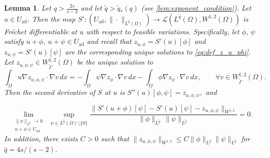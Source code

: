 \documentclass[11pt]{article}
\newcommand{\feas}{U_{\textrm{ad}}}
\newtheorem{lemma}[theorem]{Lemma}
\theoremstyle{definition}
\theoremstyle{remark}
\begin{document}
\begin{lemma}\label{lem:S_second_derivative}
Let $q > \frac{2s}{s-2}$ and let $\tilde q
> \tilde{q}_*(q)$ (see \cref{lem:exponent_condition}).  
Let $u \in \feas$. Then the map
$\displaystyle
S' :
(\feas,\|\cdot\|_{L^{\tilde q}(\Omega)})
\to
\mathcal L(L^{\tilde q}(\Omega), W^{1,2}(\Omega))
$
is Fr\'echet differentiable at $u$ with respect to feasible variations. 
Specifically, let $\phi$, $\psi$ satisfy $u+\phi$, $u + \psi \in \feas$ and recall that $z_{u, \phi} = S'(u)[\phi]$ and
$z_{u, \psi} = S'(u)[\psi]$ are the corresponding unique solutions to \eqref{eq:def_z_u_phi}. Let
$z_{u,\phi,\psi} \in W^{1,2}_{\tilde\Gamma}(\Omega)$ be the unique solution to
%
\begin{equation}\label{eq:def_z_phipsi}
\int_\Omega u \nabla z_{u,\phi,\psi} \cdot \nabla v \, dx
=
-\int_\Omega \psi \nabla z_{\phi} \cdot \nabla v \, dx
-
\int_\Omega \phi \nabla z_{\psi} \cdot \nabla v \, dx,
\qquad
\forall v \in W^{1,2}_{\tilde\Gamma}(\Omega).
\end{equation}
%
Then the second derivative of $S$ at $u$ is
$
S''(u)[\phi,\psi] = z_{u,\phi,\psi},$
and


\[
\underset{\substack{\|\phi\|_{L^{\tilde q}} \to 0\\ u+\phi\in\feas}}\lim
\;
\sup_{\psi \in L^{\tilde q}(\Omega)\setminus\{0\}}
\frac{
\| S'(u+\phi)[\psi] - S'(u)[\psi] - z_{u,\phi,\psi} \|_{W^{1,2}}
}{
\|\phi\|_{L^{\tilde q}}\,
\|\psi\|_{L^{\tilde q}}
}
= 0.
\]
%
In addition, there exists $C > 0$ such that $\|z_{u,\phi,\psi}\|_{W^{1,2}} \le C \|\phi\|_{L^{\hat{q}}}\|\psi\|_{L^{\hat{q}}}$
for $\hat{q} = 4s/(s - 2)$.
\end{lemma}
\end{document}
